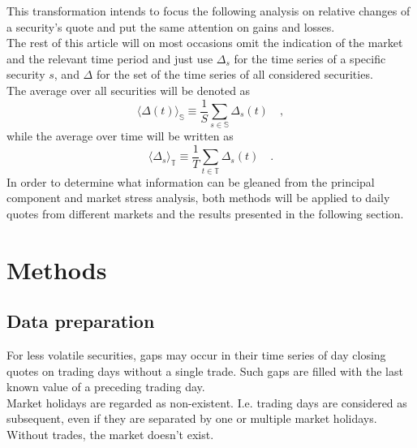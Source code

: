 \documentclass[11pt,twoside,a4paper]{article}
\begin{document}
This transformation intends to focus the following analysis on relative changes of a security's quote and put the same attention on gains and losses.\\
The rest of this article will on most occasions omit the indication of the market and the relevant time period and just use $\Delta_s$ for the time series of a specific security $s$, and $\Delta$ for the set of the time series of all considered securities.\\
The average over all securities will be denoted as
\begin{equation}
\langle\Delta(t)\rangle_\mathbb{S}\equiv\frac{1}{S}\sum_{s\in \mathbb{S}}\Delta_s(t)\quad,
\end{equation}
while the average over time will be written as
\begin{equation}
\langle\Delta_s\rangle_\mathbb{T}\equiv\frac{1}{T}\sum_{t\in \mathbb{T}}\Delta_s(t)\quad.
\end{equation}
In order to determine what information can be gleaned from the principal component and market stress analysis, both methods will be applied to daily quotes from different markets and the results presented in the following section.
\section{Methods}
\subsection{Data preparation}
For less volatile securities, gaps may occur in their time series of day closing quotes on trading days without a single trade. Such gaps are filled with the last known value of a preceding trading day.\\
Market holidays are regarded as non-existent. I.e. trading days are considered as subsequent, even if they are separated by one or multiple market holidays. Without trades, the market doesn't exist.
\end{document}
